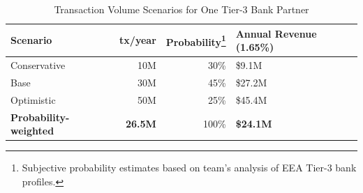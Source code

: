 \documentclass[11pt,a4paper]{article}
\begin{document}
\begin{table}[htbp]
\centering
\caption{Transaction Volume Scenarios for One Tier-3 Bank Partner}
\begin{tabularx}{\linewidth}{@{}lrrX@{}}
\toprule
\textbf{Scenario} & \textbf{tx/year} & \textbf{Probability\footnote{Subjective probability estimates based on team's analysis of EEA Tier-3 bank profiles.}} & \textbf{Annual Revenue (1.65\%)} \\
\midrule
Conservative  & 10M  & 30\%  & \$9.1M   \\
Base          & 30M  & 45\%  & \$27.2M  \\
Optimistic    & 50M  & 25\%  & \$45.4M  \\
\midrule
\textbf{Probability-weighted} & \textbf{26.5M} & 100\% & \textbf{\$24.1M} \\
\bottomrule
\end{tabularx}
\end{table}
\end{document}

